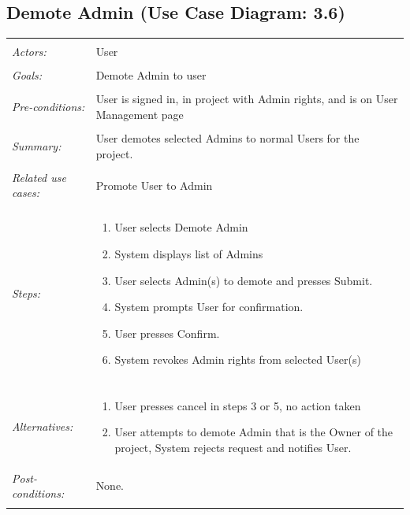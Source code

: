 \documentclass[11pt]{report}
\begin{document}
\subsection{Demote Admin (Use Case Diagram: 3.6)}
\begin{tabular}{ p{2cm} p{12cm} }
    \hline
    \\
    \textit{Actors:} & User \\ 
    \\
    \textit{Goals:} & Demote Admin to user \\
    \\
    \textit{Pre-conditions:} & User is signed in, in project with Admin rights, and is on User Management page \\
    \\
    \textit{Summary:} & User demotes selected Admins to normal Users for the project. \\ 
    \\
    \textit{Related use cases:} & Promote User to Admin \\ 
    \\
    \textit{Steps:} & \begin{enumerate}
        \item User selects Demote Admin
        \item System displays list of Admins
        \item User selects Admin(s) to demote and presses Submit.
        \item System prompts User for confirmation.
        \item User presses Confirm.
        \item System revokes Admin rights from selected User(s)
    \end{enumerate} \\
    \\
    \textit{Alternatives:} & \begin{enumerate}
        \item User presses cancel in steps 3 or 5, no action taken
        \item User attempts to demote Admin that is the Owner of the project, System rejects request and notifies User.
    \end{enumerate}
    \\
    \textit{Post-conditions:} & None. \\
    \\
    \hline
\end{tabular}
\end{document}
